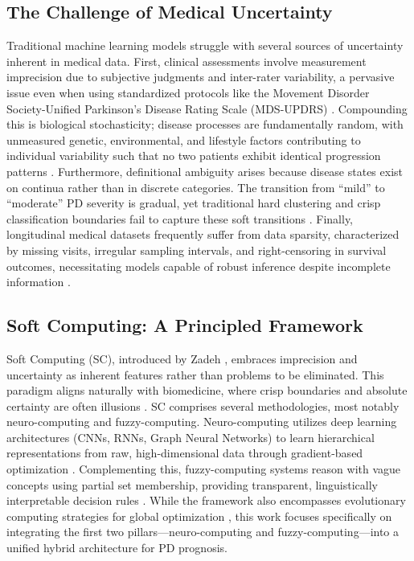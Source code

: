 \documentclass[journal,twoside,web]{ieeecolor}
\begin{document}
\subsection{The Challenge of Medical Uncertainty}
Traditional machine learning models struggle with several sources of uncertainty inherent in medical data. First, clinical assessments involve measurement imprecision due to subjective judgments and inter-rater variability, a pervasive issue even when using standardized protocols like the Movement Disorder Society-Unified Parkinson's Disease Rating Scale (MDS-UPDRS) \cite{goetz2008movement}. Compounding this is biological stochasticity; disease processes are fundamentally random, with unmeasured genetic, environmental, and lifestyle factors contributing to individual variability such that no two patients exhibit identical progression patterns \cite{poewe2017parkinson}. Furthermore, definitional ambiguity arises because disease states exist on continua rather than in discrete categories. The transition from ``mild'' to ``moderate'' PD severity is gradual, yet traditional hard clustering and crisp classification boundaries fail to capture these soft transitions \cite{kuncheva2010fuzzy}. Finally, longitudinal medical datasets frequently suffer from data sparsity, characterized by missing visits, irregular sampling intervals, and right-censoring in survival outcomes, necessitating models capable of robust inference despite incomplete information \cite{marek2011ppmi}.

\subsection{Soft Computing: A Principled Framework}
Soft Computing (SC), introduced by Zadeh \cite{zadeh1994soft}, embraces imprecision and uncertainty as inherent features rather than problems to be eliminated. This paradigm aligns naturally with biomedicine, where crisp boundaries and absolute certainty are often illusions \cite{torres2006fuzzy}. SC comprises several methodologies, most notably neuro-computing and fuzzy-computing. Neuro-computing utilizes deep learning architectures (CNNs, RNNs, Graph Neural Networks) to learn hierarchical representations from raw, high-dimensional data through gradient-based optimization \cite{lecun2015deep}. Complementing this, fuzzy-computing systems reason with vague concepts using partial set membership, providing transparent, linguistically interpretable decision rules \cite{zadeh1965fuzzy}. While the framework also encompasses evolutionary computing strategies for global optimization \cite{goldberg1989genetic}, this work focuses specifically on integrating the first two pillars---neuro-computing and fuzzy-computing---into a unified hybrid architecture for PD prognosis.
\end{document}
